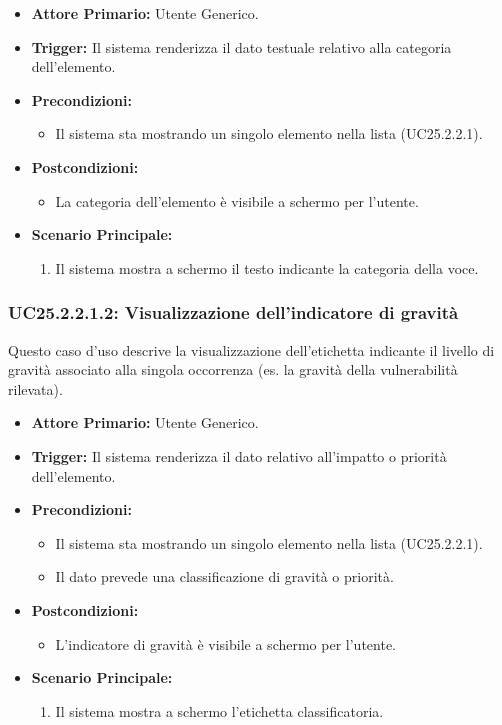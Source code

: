 \documentclass[12pt, a4paper]{article}
\begin{document}
\begin{itemize}
    \item \textbf{Attore Primario:} Utente Generico.
    \item \textbf{Trigger:} Il sistema renderizza il dato testuale relativo alla categoria dell'elemento.
    \item \textbf{Precondizioni:}
    \begin{itemize}
        \item Il sistema sta mostrando un singolo elemento nella lista (UC25.2.2.1).
    \end{itemize}
    \item \textbf{Postcondizioni:}
    \begin{itemize}
        \item La categoria dell'elemento è visibile a schermo per l'utente.
    \end{itemize}
    \item \textbf{Scenario Principale:}
    \begin{enumerate}
        \item Il sistema mostra a schermo il testo indicante la categoria della voce.
    \end{enumerate}
\end{itemize}

\subsubsection{UC25.2.2.1.2: Visualizzazione dell'indicatore di gravità}\label{uc:25.2.2.1.2}
Questo caso d'uso descrive la visualizzazione dell'etichetta indicante il livello di gravità associato alla singola occorrenza (es. la gravità della vulnerabilità rilevata).

\begin{itemize}
    \item \textbf{Attore Primario:} Utente Generico.
    \item \textbf{Trigger:} Il sistema renderizza il dato relativo all'impatto o priorità dell'elemento.
    \item \textbf{Precondizioni:}
    \begin{itemize}
        \item Il sistema sta mostrando un singolo elemento nella lista (UC25.2.2.1).
        \item Il dato prevede una classificazione di gravità o priorità.
    \end{itemize}
    \item \textbf{Postcondizioni:}
    \begin{itemize}
        \item L'indicatore di gravità è visibile a schermo per l'utente.
    \end{itemize}
    \item \textbf{Scenario Principale:}
    \begin{enumerate}
        \item Il sistema mostra a schermo l'etichetta classificatoria.
    \end{enumerate}
\end{itemize}
\end{document}
